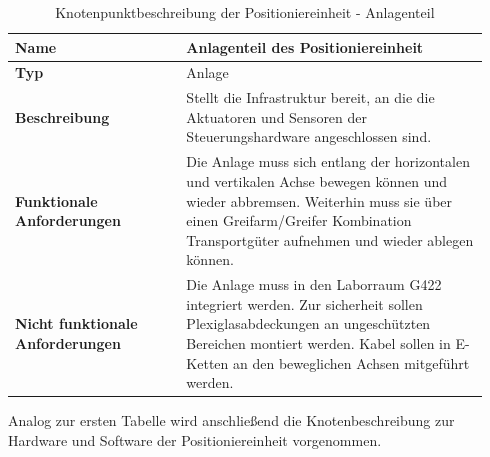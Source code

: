 \documentclass[../Bachelorarbeit.tex]{subfiles}
\begin{document}
\begin{table}[H]
    \centering
    \begin{tabular}{| p{0.34\linewidth} | p{0.6\linewidth} |}
        \hline
        \textbf{Name} & Anlagenteil des Positioniereinheit \\ \hline
        \textbf{Typ} & Anlage \\ \hline
        \textbf{Beschreibung} & Stellt die Infrastruktur bereit, an die die Aktuatoren und Sensoren der Steuerungshardware angeschlossen sind. \\ \hline
        \textbf{Funktionale Anforderungen} & Die Anlage muss sich entlang der horizontalen und vertikalen Achse bewegen können und wieder abbremsen. Weiterhin muss sie über einen Greifarm/Greifer Kombination Transportgüter aufnehmen und wieder ablegen können. \\ \hline
        \textbf{Nicht funktionale Anforderungen} & Die Anlage muss in den Laborraum G422 integriert werden. Zur sicherheit sollen Plexiglasabdeckungen an ungeschützten Bereichen montiert werden. Kabel sollen in E-Ketten an den beweglichen Achsen mitgeführt werden. \\ \hline
    \end{tabular}
    \caption[Knotenpunktbeschreibung - Anlagenteil]{Knotenpunktbeschreibung der Positioniereinheit - Anlagenteil}
    \label{tab:my-table50}
\end{table}

Analog zur ersten Tabelle wird anschließend die Knotenbeschreibung zur Hardware und Software der Positioniereinheit vorgenommen.
\end{document}
